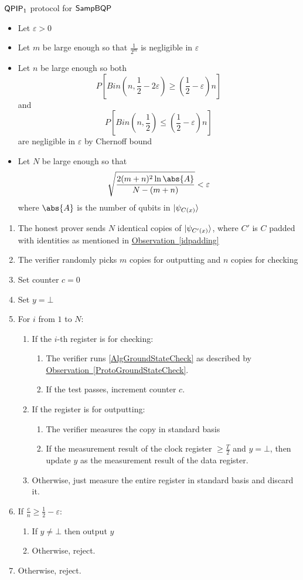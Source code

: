 \begin{protocol}{$\operatorname{\mathsf{QPIP}}_1$ protocol for $\operatorname{\mathsf{SampBQP}}$}
	\label{ProtoQPIP1}
	\begin{itemize}
		\item Let $\varepsilon>0$
		\item Let $m$ be large enough so that $\frac{1}{2^m}$ is negligible in $\varepsilon$
		\item Let $n$ be large enough so both
			$$P\left[Bin(n, \frac{1}{2}-2\varepsilon)\geq\left(\frac{1}{2}-\varepsilon\right)n\right]$$
			and
			$$P\left[Bin(n, \frac{1}{2})\leq\left(\frac{1}{2}-\varepsilon\right)n\right]$$ are negligible in $\varepsilon$ by Chernoff bound
		\item Let $N$ be large enough so that $$\sqrt{\frac{2(m+n)^2\ln\abs{A}}{N-(m+n)}}<\varepsilon$$
			where $\abs{A}$ is the number of qubits in $\ket{\psi_{C(x)}}$
	\end{itemize}
	\begin{enumerate}
		\item The honest prover sends $N$ identical copies of $\ket{\psi_{C'(x)}}$, where $C'$ is $C$ padded with identities as mentioned in \hyperref[idpadding]{Observation~\ref*{idpadding}}
		\item The verifier randomly picks $m$ copies for outputting and $n$ copies for checking
		\item Set counter $c=0$
		\item Set $y=\bot$
		\item For $i$ from $1$ to $N$:
		\begin{enumerate}
			\item If the $i$-th register is for checking:
			\begin{enumerate}
				\item The verifier runs \autoref{AlgGroundStateCheck} as described by \hyperref[ProtoGroundStateCheck]{Observation~\ref*{ProtoGroundStateCheck}}.
				\item If the test passes, increment counter $c$.
			\end{enumerate}
			\item If the register is for outputting:
			\begin{enumerate}
				\item The verifier measures the copy in standard basis
				\item If the measurement result of the clock register $\geq\frac{T}{2}$ and $y=\bot$, then update $y$ as the measurement result of the data register.
			\end{enumerate}
			\item Otherwise, just measure the entire register in standard basis and discard it.
		\end{enumerate}
		\item If $\frac{c}{n}\geq\frac{1}{2}-\varepsilon$:
		\begin{enumerate}
			\item If $y\ne\bot$ then output $y$
			\item Otherwise, reject.
		\end{enumerate}
		\item Otherwise, reject.
	\end{enumerate}
\end{protocol}

